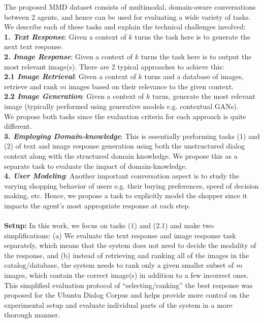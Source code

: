 \documentclass[letterpaper]{article} %
\begin{document}
The proposed MMD dataset consists of multimodal, domain-aware conversations between 2 agents, and hence can be used for evaluating a wide variety of tasks. We describe each of these tasks and explain the technical challenges involved:\\
\noindent\textbf{1. \emph{Text Response}}: Given a context of $k$ turns the task here is to generate the next text response.\\
\textbf{2. \emph{Image Response}}: Given a context of $k$ turns the task here is to output the most relevant image(s). There are 2 typical approaches to achieve this:\\
\textbf{2.1 \emph{Image Retrieval}}: Given a context of $k$ turns and a database of images, retrieve and rank $m$ images based on their relevance to the given context. \\
\textbf{2.2 \emph{Image Generation}}: Given a context of $k$ turns, generate the most relevant image (typically performed using generative models e.g. contextual GANs\cite{reed2016generative,DBLP:conf/nips/GoodfellowPMXWOCB14}).\\
We propose both tasks since the evaluation criteria for each approach is quite different.\\
\textbf{3. \emph{Employing Domain-knowledge}}: This is essentially performing tasks (1) and (2) of text and image response generation using both the unstructured dialog context along with the structured domain knowledge. We propose this as a separate task to evaluate the impact of domain-knowledge.\\
\textbf{4. \emph{User Modeling}}: Another important conversation aspect is to study the varying shopping behavior of users e.g. their buying preferences, speed of decision making, etc. Hence, we propose a task to explicitly model the shopper since it impacts the agent's most appropriate response at each step.
\\\\
\noindent \textbf{Setup:} In this work, we focus on tasks (1) and (2.1) and make two simplifications: (a) We evaluate the text response and image response task separately, which means that the system does not need to decide the modality of the response, and (b) instead of retrieving and ranking all of the images in the catalog/database, the system needs to rank only a given smaller subset of $m$ images, which contain the correct image(s) in addition to a few incorrect ones. This simplified evaluation protocol of ``selecting/ranking'' the best response was proposed for the Ubuntu Dialog Corpus \cite{DBLP:conf/sigdial/LowePSP15} and helps provide more control on the experimental setup and evaluate individual parts of the system in a more thorough manner. 
\end{document}
